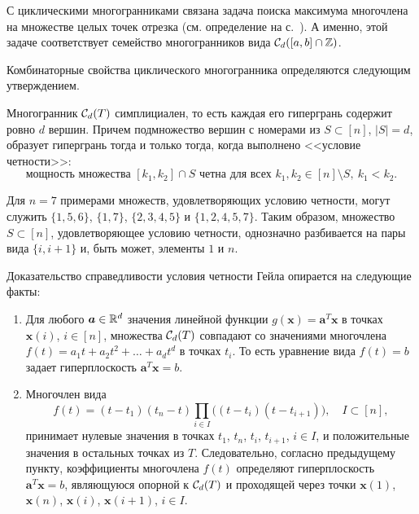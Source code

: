 С циклическими многогранниками связана задача поиска максимума многочлена на множестве целых точек отрезка (см. определение на с.~\pageref{def:PolyMax}).
А именно, этой задаче соответствует семейство многогранников вида ${\mathcal C}_d([a,b] \cap \mathbb{Z})$.

Комбинаторные свойства циклического многогранника определяются следующим утверждением.

\begin{theorem}
Многогранник ${\mathcal C}_d(T)$ симплициален, то есть каждая его гипергрань содержит ровно $d$ вершин. Причем подмножество вершин с номерами из $S \subset [n]$, $|S|=d$, образует гипергрань тогда и только тогда, когда выполнено <<условие четности>>:
\[
\text{мощность множества } [k_1, k_2]\cap S \text{ четна для всех } k_1, k_2 \in [n] \setminus S, \ k_1 < k_2.
\]
\end{theorem}

Для $n=7$ примерами множеств, удовлетворяющих условию четности, могут служить
$\{1,5,6\}$, $\{1,7\}$, $\{2,3,4,5\}$ и $\{1,2,4,5,7\}$.
Таким образом, множество $S \subset [n]$, удовлетворяющее условию четности, однозначно разбивается на пары вида $\{i,i+1\}$ и, быть может, элементы $1$ и $n$.

Доказательство справедливости условия четности Гейла опирается на следующие факты:
\begin{enumerate}
\item Для любого $\bm{a} \in \mathbb{R}^d$ значения линейной функции $g(\bm{x}) = \bm{a}^T \bm{x}$ в точках $\bm{x}(i)$, $i\in[n]$, множества ${\mathcal C}_d(T)$ совпадают со значениями многочлена $f(t) = a_1 t + a_2 t^2 + \dots + a_d t^d$ в точках $t_i$. То есть уравнение вида $f(t) = b$ задает гиперплоскость $\bm{a}^T \bm{x} = b$.
\item Многочлен вида 
\begin{equation}
\label{eq:CyclicPol}
f(t) = (t - t_1)(t_n - t) \prod_{i \in I} \bigl((t - t_i)(t - t_{i+1})\bigr), \quad I\subset [n],
\end{equation}
принимает нулевые значения в точках $t_1$, $t_n$, $t_i$, $t_{i+1}$, $i\in I$, и положительные значения в остальных точках из $T$. Следовательно, согласно предыдущему пункту, коэффициенты многочлена $f(t)$ определяют гиперплоскость $\bm{a}^T \bm{x} = b$, являющуюся опорной к ${\mathcal C}_d(T)$ и проходящей через точки $\bm{x}(1)$, $\bm{x}(n)$, $\bm{x}(i)$, $\bm{x}(i+1)$, $i\in I$.
\end{enumerate}


